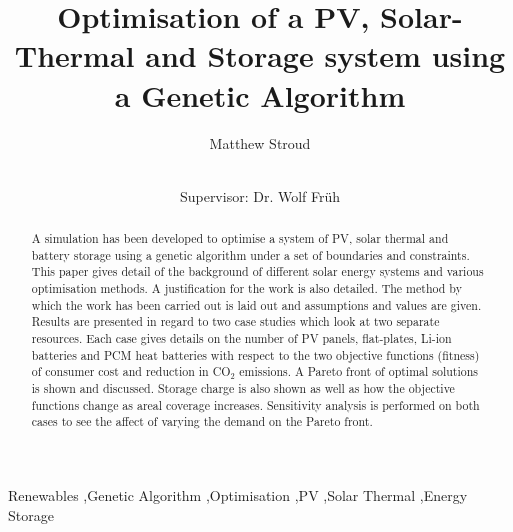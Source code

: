 \documentclass[final,11pt,times,twocolumn]{elsarticle}
\begin{document}
\begin{frontmatter}


\title{Optimisation of a PV, Solar-Thermal and Storage system using a Genetic Algorithm}

\author{Matthew Stroud}




\author{\\ Supervisor: Dr. Wolf Fr\"uh}
\address{Edinburgh, Scotland}

\begin{abstract}
A simulation has been developed to optimise a system of PV, solar thermal and battery storage using a genetic algorithm under a set of boundaries and constraints. This paper gives detail of the background of different solar energy systems and various optimisation methods. A justification for the work is also detailed. The method by which the work has been carried out is laid out and assumptions and values are given. Results are presented in regard to two case studies which look at two separate resources. Each case gives details on the number of PV panels, flat-plates, Li-ion batteries and PCM heat batteries with respect to the two objective functions (fitness) of consumer cost and reduction in CO$_2$ emissions. A Pareto front of optimal solutions is shown and discussed. Storage charge is also shown as well as how the objective functions change as areal coverage increases. Sensitivity analysis is performed on both cases to see the affect of varying the demand on the Pareto front.

\end{abstract}

\begin{keyword}
Renewables \sep Genetic Algorithm \sep Optimisation \sep PV \sep Solar Thermal \sep Energy Storage


\end{keyword}

\end{frontmatter}
\end{document}
